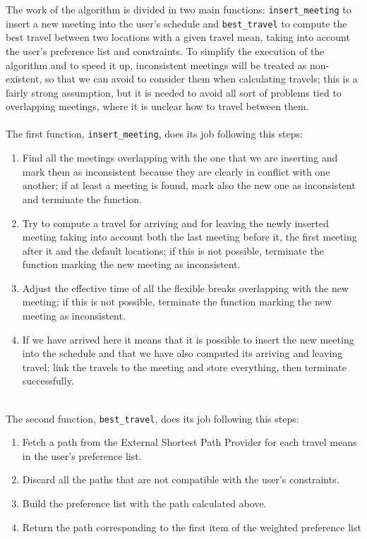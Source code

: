 The work of the algorithm is divided in two main functions: \texttt{insert\_meeting} to insert a new meeting into the user's schedule and \texttt{best\_travel} to compute the best travel between two locations with a given travel mean, taking into account the user's preference list and constraints. To simplify the execution of the algorithm and to speed it up, inconsistent meetings will be treated as non-existent, so that we can avoid to consider them when calculating travels; this is a fairly strong assumption, but it is needed to avoid all sort of problems tied to overlapping meetings, where it is unclear how to travel between them. \\
\\
The first function, \texttt{insert\_meeting}, does its job following this steps:
\begin{enumerate}
\item Find all the meetings overlapping with the one that we are inserting and mark them as inconsistent because they are clearly in conflict with one another; if at least a meeting is found, mark also the new one as inconsistent and terminate the function.
\item Try to compute a travel for arriving and for leaving the newly inserted meeting taking into account both the last meeting before it, the first meeting after it and the default locations; if this is not possible, terminate the function marking the new meeting as inconsistent.
\item Adjust the effective time of all the flexible breaks overlapping with the new meeting; if this is not possible, terminate the function marking the new meeting as inconsistent.
\item If we have arrived here it means that it is possible to insert the new meeting into the schedule and that we have also computed its arriving and leaving travel; link the travels to the meeting and store everything, then terminate successfully.
\end{enumerate}
\\
The second function, \texttt{best\_travel}, does its job following this steps:
\begin{enumerate}
\item Fetch a path from the External Shortest Path Provider for each travel means in the user's preference list.
\item Discard all the paths that are not compatible with the user's constraints.
\item Build the preference list with the path calculated above.
\item Return the path corresponding to the first item of the weighted preference list
\end{enumerate}